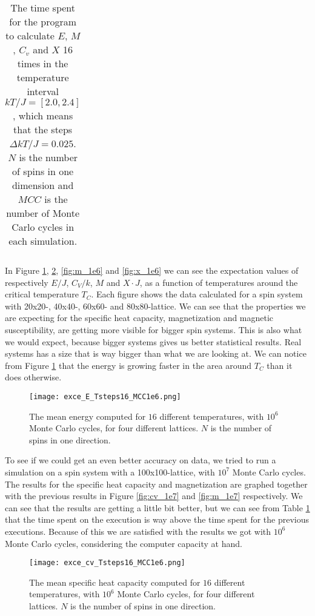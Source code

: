 \documentclass[12pt]{article}
\begin{document}
\begin{flushleft}
\begin{table}[!h]
\begin{center}
\begin{tabular}{| c | c | c | c |}
  \hline
\end{tabular}
\end{center}
\caption{\label{tab:time_spent_T_c}The time spent for the program to calculate $E$, $M$, $C_v$ and $X$ 16 times in the temperature interval $kT/J = [2.0,2.4]$, which means that the steps $\Delta kT/J = 0.025$. $N$ is the number of spins in one dimension and $MCC$ is the number of Monte Carlo cycles in each simulation.}
\end{table}
\newpage
In Figure \ref{fig:E_1e6}, \ref{fig:cv_1e6}, \ref{fig:m_1e6} and \ref{fig:x_1e6} we can see the expectation values of respectively $E/J$, $C_V/k$, $M$ and $X\cdot J$, as a function of temperatures around the critical temperature $T_C$. Each figure shows the data calculated for a spin system with 20x20-, 40x40-, 60x60- and 80x80-lattice. We can see that the properties we are expecting for the specific heat capacity, magnetization and magnetic susceptibility, are getting more visible for bigger spin systems. This is also what we would expect, because bigger systems gives us better statistical results. Real systems has a size that is way bigger than what we are looking at. We can notice from Figure \ref{fig:E_1e6} that the energy is growing faster in the area around $T_C$ than it does otherwise.

\begin{figure}[!h]
\begin{center}
\texttt{[image: exce\_E\_Tsteps16\_MCC1e6.png]}
\caption{\label{fig:E_1e6}The mean energy computed for $16$ different temperatures, with $10^6$ Monte Carlo cycles, for four different lattices. $N$ is the number of spins in one direction.}
\end{center}
\end{figure}

To see if we could get an even better accuracy on data, we tried to run a simulation on a spin system with a 100x100-lattice, with $10^7$ Monte Carlo cycles. The results for the specific heat capacity and magnetization are graphed together with the previous results in Figure \ref{fig:cv_1e7} and \ref{fig:m_1e7} respectively. We can see that the results are getting a little bit better, but we can see from Table \ref{tab:time_spent_T_c} that the time spent on the execution is way above the time spent for the previous executions. Because of this we are satisfied with the results we got with $10^6$ Monte Carlo cycles, considering the computer capacity at hand.
\newpage
\begin{figure}[!h]
\begin{center}
\texttt{[image: exce\_cv\_Tsteps16\_MCC1e6.png]}
\caption{\label{fig:cv_1e6}The mean specific heat capacity computed for $16$ different temperatures, with $10^6$ Monte Carlo cycles, for four different lattices. $N$ is the number of spins in one direction.}
\end{center}
\end{figure}


\end{flushleft}
\end{document}
